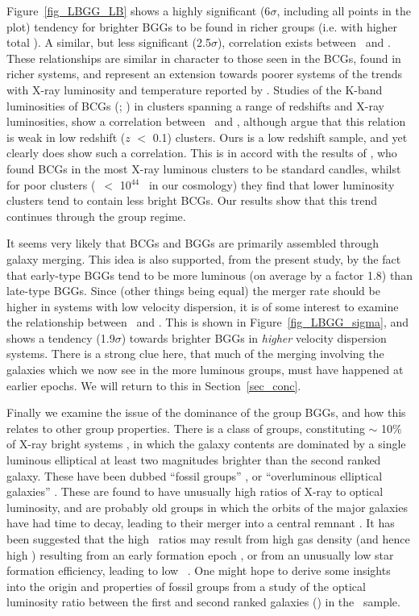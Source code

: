 \documentclass[usenatbib]{mn2e}
\begin{document}
Figure~\ref{fig_LBGG_LB} shows a highly significant (6$\sigma$, including all
points in the plot) tendency for brighter BGGs to be found in richer groups (i.e.
with higher total \LB).  A similar, but less significant (2.5$\sigma$),
correlation exists between \LBGG\ and \LX.  These relationships are similar in
character to those seen in the BCGs, found in richer systems, and represent an
extension towards poorer systems of the trends with X-ray luminosity and
temperature reported by \citet{edge91a}.  Studies of the K-band luminosities of
BCGs (\citealt*{burke00}; \citealt{brough02}) in clusters spanning a range of
redshifts and X-ray luminosities, show a correlation between \LX\ and \LBGG,
although \citet{brough02} argue that this relation is weak in low redshift ($z$
$<$ 0.1) clusters.  Ours is a low redshift sample, and yet clearly does show such
a correlation.  This is in accord with the results of \citet{burke00}, who found
BCGs in the most X-ray luminous clusters to be standard candles, whilst for poor
clusters (\LX\ $<$ 10$^{44}$ \ergps\ in our cosmology) they find that lower
luminosity clusters tend to contain less bright BCGs. Our results show that this
trend continues through the group regime.

It seems very likely \citep{dubinski98} that BCGs and BGGs are primarily
assembled through galaxy merging.  This idea is also supported, from the present
study, by the fact that early-type BGGs tend to be more luminous (on average by
a factor 1.8) than late-type BGGs.  Since (other things being equal) the merger
rate should be higher in systems with low velocity dispersion, it is of some
interest to examine the relationship between \LBGG\ and \sigmav.  This is shown
in Figure~\ref{fig_LBGG_sigma}, and shows a tendency (1.9$\sigma$) towards
brighter BGGs in {\it higher} velocity dispersion systems.  There is a strong
clue here, that much of the merging involving the galaxies which we now see in
the more luminous groups, must have happened at earlier epochs.  We will return
to this in Section~\ref{sec_conc}.

Finally we examine the issue of the dominance of the group BGGs, and how this
relates to other group properties.  There is a class of groups, constituting
$\sim$ 10\% of X-ray bright systems \citep{jones03}, in which the galaxy contents
are dominated by a single luminous elliptical at least two magnitudes brighter
than the second ranked galaxy.  These have been dubbed ``fossil groups''
\citep{ponman94}, or ``overluminous elliptical galaxies'' \citep{vikhlinin99c}.
These are found to have unusually high ratios of X-ray to optical luminosity, and
are probably old groups in which the orbits of the major galaxies have had time
to decay, leading to their merger into a central remnant \citep{jones03}.  It has
been suggested that the high \LXpLB\ ratios may result from high gas density (and
hence high \LX) resulting from an early formation epoch \citep{jones03}, or from
an unusually low star formation efficiency, leading to low \LB\
\citep{vikhlinin99c}.  One might hope to derive some insights into the origin and
properties of fossil groups from a study of the optical luminosity ratio between
the first and second ranked galaxies (\dom) in the \GEMS\ sample.
\end{document}
